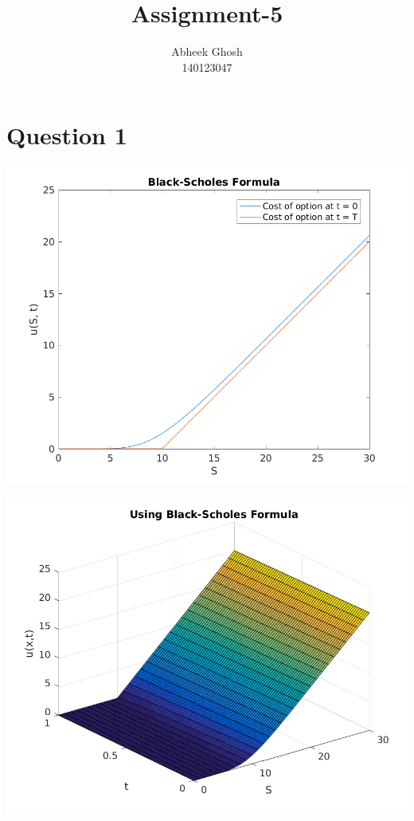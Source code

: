 \documentclass{article}
\begin{document}
	\title{\textbf{Assignment-5}}
	\author{Abheek Ghosh \\ 
		140123047 }
	
	\maketitle

\section{Question 1}

\includegraphics{"q1_1"}
\pagebreak


\includegraphics{"q1_2"}
\pagebreak
\end{document}
